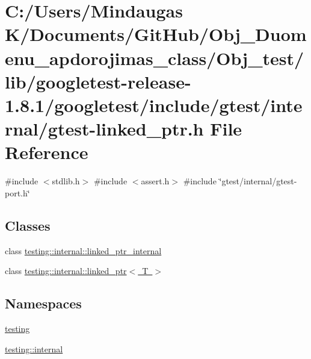 \hypertarget{gtest-linked__ptr_8h}{}\section{C\+:/\+Users/\+Mindaugas K/\+Documents/\+Git\+Hub/\+Obj\+\_\+\+Duomenu\+\_\+apdorojimas\+\_\+class/\+Obj\+\_\+test/lib/googletest-\/release-\/1.8.1/googletest/include/gtest/internal/gtest-\/linked\+\_\+ptr.h File Reference}
\label{gtest-linked__ptr_8h}
{\ttfamily \#include $<$stdlib.\+h$>$}\newline
{\ttfamily \#include $<$assert.\+h$>$}\newline
{\ttfamily \#include \char`\"{}gtest/internal/gtest-\/port.\+h\char`\"{}}\newline
\subsection*{Classes}
\begin{DoxyCompactItemize}
\item 
class \mbox{\hyperlink{classtesting_1_1internal_1_1linked__ptr__internal}{testing\+::internal\+::linked\+\_\+ptr\+\_\+internal}}
\item 
class \mbox{\hyperlink{classtesting_1_1internal_1_1linked__ptr}{testing\+::internal\+::linked\+\_\+ptr$<$ T $>$}}
\end{DoxyCompactItemize}
\subsection*{Namespaces}
\begin{DoxyCompactItemize}
\item 
 \mbox{\hyperlink{namespacetesting}{testing}}
\item 
 \mbox{\hyperlink{namespacetesting_1_1internal}{testing\+::internal}}
\end{DoxyCompactItemize}
